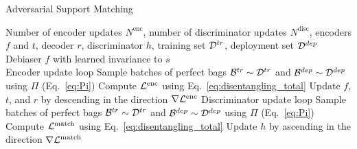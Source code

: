 \algrenewcommand{}
\algrenewcommand{}
\begin{algorithm}
  \caption{Adversarial Support Matching}\label{alg:cap} 
  \begin{algorithmic}
    \Require Number of encoder updates $N^\text{enc}$, number of discriminator updates $N^\text{disc}$,
    encoders $f$ and $t$, decoder $r$, discriminator $h$, training set ${\mathcal{D}}^{tr}$, deployment set
    ${\mathcal{D}}^{dep}$
    \Ensure Debiaser $f$ with learned invariance to $s$
    \\

     \Comment Encoder update loop
    \State Sample batches of perfect bags ${\mathcal{B}}^{tr} \sim {\mathcal{D}}^{tr}$ and ${\mathcal{B}}^{dep} \sim
    {\mathcal{D}}^{dep}$ using $\Pi$ (Eq.~\ref{eq:Pi})
    \State Compute ${\mathcal{L}}^\text{enc}$ using Eq.~\ref{eq:disentangling_total}
    \State Update $f$, $t$, and $r$ by descending in the direction $\nabla {\mathcal{L}}^\text{enc}$
     \Comment Discriminator update loop
    \State Sample batches of perfect bags ${\mathcal{B}}^{tr} \sim {\mathcal{D}}^{tr}$ and ${\mathcal{B}}^{dep} \sim
    {\mathcal{D}}^{dep}$ using $\Pi$ (Eq.~\ref{eq:Pi})
    \State Compute ${\mathcal{L}}^\text{match}$ using Eq.~\ref{eq:disentangling_total}
    \State Update $h$ by ascending in the direction $\nabla {\mathcal{L}}^\text{match}$
    \EndFor
    \EndFor

  \end{algorithmic}
\end{algorithm}
